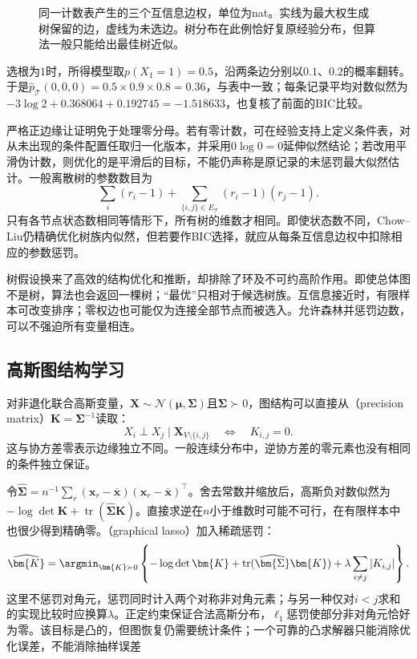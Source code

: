 \begin{figure}[htbp]
  \centering
  
  \caption{同一计数表产生的三个互信息边权，单位为nat。实线为最大权生成树保留的边，虚线为未选边。树分布在此例恰好复原经验分布，但算法一般只能给出最佳树近似。}
  \label{fig:pgm-structure-learning-chow-liu}
\end{figure}

选根为$1$时，所得模型取$p(X_1=1)=0.5$，沿两条边分别以$0.1$、$0.2$的概率翻转。于是$\widehat p_{\mathcal{T}}(0,0,0)=0.5\times0.9\times0.8=0.36$，与表中一致；每条记录平均对数似然为$-3\log2+0.368064+0.192745=-1.518633$，也复核了前面的BIC比较。

严格正边缘让证明免于处理零分母。若有零计数，可在经验支持上定义条件表，对从未出现的条件配置任取归一化版本，并采用$0\log0=0$延伸似然结论；若改用平滑伪计数，则优化的是平滑后的目标，不能仍声称是原记录的未惩罚最大似然估计。一般离散树的参数数目为
\[
  \sum_i(r_i-1)+
  \sum_{\{i,j\}\in E_{\mathcal{T}}}(r_i-1)(r_j-1).
\]
只有各节点状态数相同等情形下，所有树的维数才相同。即使状态数不同，Chow--Liu仍精确优化树族内似然，但若要作BIC选择，就应从每条互信息边权中扣除相应的参数惩罚。

树假设换来了高效的结构优化和推断，却排除了环及不可约高阶作用。即使总体图不是树，算法也会返回一棵树；“最优”只相对于候选树族。互信息接近时，有限样本可改变排序；零权边也可能仅为连接全部节点而被选入。允许森林并惩罚边数，可以不强迫所有变量相连。

\subsection{高斯图结构学习}
\label{sec:pgm-structure-learning-gaussian}

对非退化联合高斯变量，$\bm{X}\sim\mathcal{N}(\bm{\mu},\bm{\Sigma})$且$\bm{\Sigma}\succ0$，图结构可以直接从（precision matrix）$\bm{K}=\bm{\Sigma}^{-1}$读取：
\[
  X_i\perp X_j\mid\bm{X}_{V\setminus\{i,j\}}
  \quad\Longleftrightarrow\quad K_{i,j}=0.
\]
这与协方差零表示边缘独立不同。一般连续分布中，逆协方差的零元素也没有相同的条件独立保证。

令$\widehat{\bm{\Sigma}}=n^{-1}\sum_r(\bm{x}_r-\overline{\bm{x}})(\bm{x}_r-\overline{\bm{x}})^{\top}$。舍去常数并缩放后，高斯负对数似然为$-\log\det\bm{K}+\operatorname{tr}(\widehat{\bm{\Sigma}}\bm{K})$。直接求逆在$n$小于维数时可能不可行，在有限样本中也很少得到精确零。（graphical lasso）加入稀疏惩罚：
\begin{equation}
  \widehat{\bm{K}}
  =\argmin_{\bm{K}\succ0}
    \left\{-\log\det\bm{K}
      +\operatorname{tr}(\widehat{\bm{\Sigma}}\bm{K})
      +\lambda\sum_{i\ne j}|K_{i,j}|\right\}.
  \label{eq:pgm-structure-learning-glasso}
\end{equation}
这里不惩罚对角元，惩罚同时计入两个对称非对角元素；与另一种仅对$i<j$求和的实现比较时应换算$\lambda$。正定约束保证合法高斯分布，$\ell_1$惩罚使部分非对角元恰好为零。该目标是凸的，但图恢复仍需要统计条件；一个可靠的凸求解器只能消除优化误差，不能消除抽样误差

